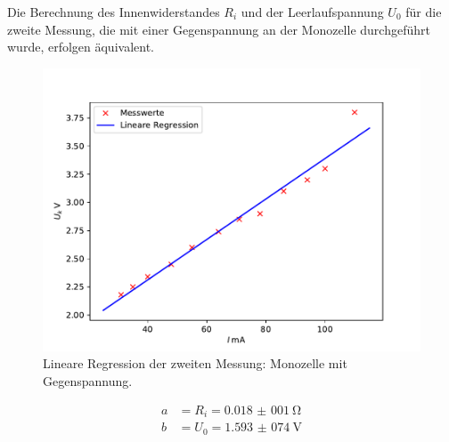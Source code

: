 \noindent Die Berechnung des Innenwiderstandes $R_{i}$ und der Leerlaufspannung $U_{0}$ für
die zweite Messung, die mit einer Gegenspannung an der Monozelle durchgeführt wurde,
erfolgen äquivalent.

\begin{figure}[H]
  \centering
  \includegraphics{plot2.pdf}
  \caption{Lineare Regression der zweiten Messung: Monozelle mit Gegenspannung.}
  \label{fig:plot2}
\end{figure}

\begin{align*}
  a &= R_{i} = \SI{0,018(001)}{\ohm} \\
  b &= U_{0} = \SI{1,593(074)}{\volt}
\end{align*}


